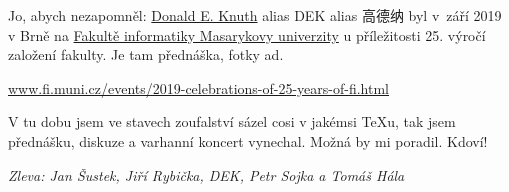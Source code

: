 Jo, abych nezapomněl: 
\href{https://www-cs-faculty.stanford.edu/~knuth/}{Donald E. Knuth} 
alias DEK alias 
{\malcjkv 高德纳}
byl v~září 2019 v Brně na 
\href{https://www.fi.muni.cz/events/2019-celebrations-of-25-years-of-fi.html.en}{Fakultě informatiky Masarykovy univerzity} u příležitosti 25. výročí založení fakulty. Je tam přednáška, fotky ad.%
\smallskip

\noindent\hfil
\url{www.fi.muni.cz/events/2019-celebrations-of-25-years-of-fi.html}%
\smallskip

V tu dobu jsem ve stavech zoufalství sázel cosi v jakémsi \TeX u, tak jsem přednášku, diskuze a varhanní koncert vynechal. Možná by mi  poradil. Kdoví!
\medskip

\noindent\hfil
{}%
\smallskip

\noindent
\hfil\textit{Zleva: Jan Šustek, Jiří Rybička, DEK, Petr Sojka a Tomáš Hála}


